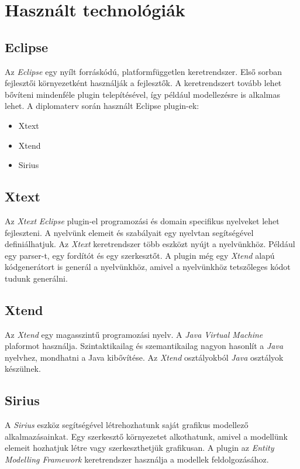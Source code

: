 \clearpage\section{Használt technológiák}
\subsection{Eclipse}

Az \textit{Eclipse} egy nyílt forráskódú, platformfüggetlen keretrendszer.
Első sorban fejlesztői környezetként használják a fejlesztők.
A keretrendszert tovább lehet bővíteni mindenféle plugin telepítésével, így például modellezésre is alkalmas lehet.
A diplomaterv során használt Eclipse plugin-ek:

\begin{itemize}
    \item Xtext
    \item Xtend
    \item Sirius
\end{itemize}

\subsection{Xtext}

Az \textit{Xtext} \textit{Eclipse} plugin-el programozási és domain specifikus nyelveket lehet fejleszteni.
A nyelvünk elemeit és szabályait egy nyelvtan segítségével definiálhatjuk.
Az \textit{Xtext} keretrendszer több eszközt nyújt a nyelvünkhöz.
Például egy parser-t, egy fordítót és egy szerkesztőt.
A plugin még egy \textit{Xtend} alapú kódgenerátort is generál a nyelvünkhöz, amivel a nyelvünkhöz tetszőleges kódot tudunk generálni.

\subsection{Xtend}

Az \textit{Xtend} egy magasszintű programozási nyelv.
A \textit{Java Virtual Machine} plaformot használja.
Szintaktikailag és szemantikailag nagyon hasonlít a \textit{Java} nyelvhez, mondhatni a Java kibővítése.
Az \textit{Xtend} osztályokból \textit{Java} osztályok készülnek.

\subsection{Sirius}

A \textit{Sirius} eszköz segítségével létrehozhatunk saját grafikus modellező alkalmazásainkat.
Egy szerkesztő környezetet alkothatunk, amivel a modellünk elemeit hozhatjuk létre vagy szerkeszthetjük grafikusan.
A plugin az \textit{Entity Modelling Framework} keretrendszer használja a modellek feldolgozásához.